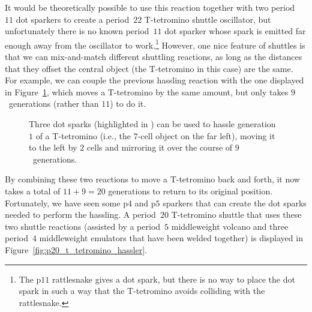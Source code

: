 It would be theoretically possible to use this reaction together with two period~$11$ dot sparkers to create a period~$22$ T-tetromino shuttle oscillator, but unfortunately there is no known period~$11$ dot sparker whose spark is emitted far enough away from the oscillator to work.\footnote{The p$11$ rattlesnake gives a dot spark, but there is no way to place the dot spark in such a way that the T-tetromino avoids colliding with the rattlesnake.} However, one nice feature of shuttles is that we can mix-and-match different shuttling reactions, as long as the distances that they offset the central object (the T-tetromino in this case) are the same. For example, we can couple the previous hassling reaction with the one displayed in Figure~\ref{fig:t_tetromino_hassle_2}, which moves a T-tetromino by the same amount, but only takes $9$~generations (rather than $11$) to do it.

\begin{figure}[!htb]
	\centering
	\caption{Three dot sparks (highlighted in ) can be used to hassle generation~$1$ of a T-tetromino (i.e., the $7$-cell object on the far left), moving it to the left by $2$ cells and mirroring it over the course of $9$~generations.}\label{fig:t_tetromino_hassle_2}
\end{figure}

By combining these two reactions to move a T-tetromino back and forth, it now takes a total of $11 + 9 = 20$ generations to return to its original position. Fortunately, we have seen some p$4$ and p$5$ sparkers that can create the dot sparks needed to perform the hassling. A period~$20$ T-tetromino shuttle that uses these two shuttle reactions (assisted by a period~$5$ middleweight volcano and three period~$4$ middleweight emulators that have been welded together) is displayed in Figure~\ref{fig:p20_t_tetromino_hassler}.

